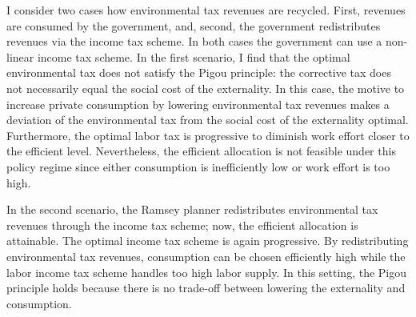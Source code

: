 I consider two cases how environmental tax revenues are recycled. First, revenues are consumed by the government, and, second, the government redistributes revenues via the income tax scheme. In both cases the government can use a non-linear income tax scheme. In the first scenario, I find that the optimal environmental tax does not satisfy the Pigou principle: the corrective tax does not necessarily equal the social cost of the externality. 
In this case, the motive to increase private consumption by lowering environmental tax revenues makes a deviation of the environmental tax from the social cost of the externality optimal.
Furthermore, the optimal labor tax is progressive to diminish work effort closer to the efficient level.
Nevertheless, the efficient allocation is not feasible under this policy regime since either consumption is inefficiently low or work effort is too high. 

%
In the second scenario, the Ramsey planner redistributes environmental tax revenues through the income tax scheme; now, the efficient allocation is attainable. The optimal income tax scheme is again progressive. By redistributing environmental tax revenues, consumption can be chosen efficiently high while the labor income tax scheme handles too high labor supply. %
In this setting, the Pigou principle holds because there is no trade-off between lowering the externality and consumption.
% 
% 
% 



